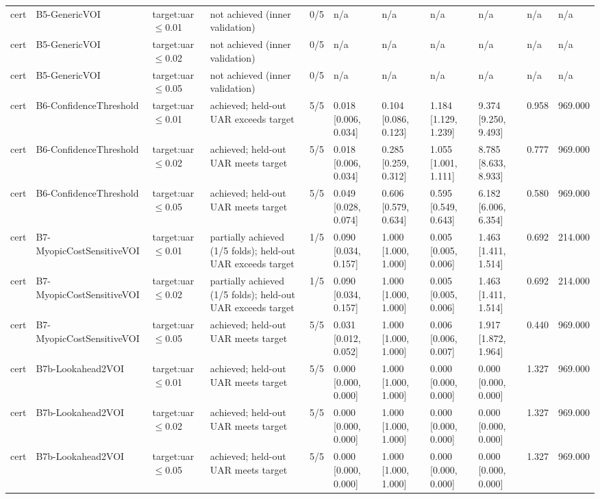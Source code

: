 \begin{table}[!ht]
{\begin{tabular}{lllllllllll}
cert & B5-GenericVOI & target:uar$\le$0.01 & not achieved (inner validation) & 0/5 & n/a & n/a & n/a & n/a & n/a & n/a \\
cert & B5-GenericVOI & target:uar$\le$0.02 & not achieved (inner validation) & 0/5 & n/a & n/a & n/a & n/a & n/a & n/a \\
cert & B5-GenericVOI & target:uar$\le$0.05 & not achieved (inner validation) & 0/5 & n/a & n/a & n/a & n/a & n/a & n/a \\
cert & B6-ConfidenceThreshold & target:uar$\le$0.01 & achieved; held-out UAR exceeds target & 5/5 & 0.018 [0.006, 0.034] & 0.104 [0.086, 0.123] & 1.184 [1.129, 1.239] & 9.374 [9.250, 9.493] & 0.958 & 969.000 \\
cert & B6-ConfidenceThreshold & target:uar$\le$0.02 & achieved; held-out UAR meets target & 5/5 & 0.018 [0.006, 0.034] & 0.285 [0.259, 0.312] & 1.055 [1.001, 1.111] & 8.785 [8.633, 8.933] & 0.777 & 969.000 \\
cert & B6-ConfidenceThreshold & target:uar$\le$0.05 & achieved; held-out UAR meets target & 5/5 & 0.049 [0.028, 0.074] & 0.606 [0.579, 0.634] & 0.595 [0.549, 0.643] & 6.182 [6.006, 6.354] & 0.580 & 969.000 \\
cert & B7-MyopicCostSensitiveVOI & target:uar$\le$0.01 & partially achieved (1/5 folds); held-out UAR exceeds target & 1/5 & 0.090 [0.034, 0.157] & 1.000 [1.000, 1.000] & 0.005 [0.005, 0.006] & 1.463 [1.411, 1.514] & 0.692 & 214.000 \\
cert & B7-MyopicCostSensitiveVOI & target:uar$\le$0.02 & partially achieved (1/5 folds); held-out UAR exceeds target & 1/5 & 0.090 [0.034, 0.157] & 1.000 [1.000, 1.000] & 0.005 [0.005, 0.006] & 1.463 [1.411, 1.514] & 0.692 & 214.000 \\
cert & B7-MyopicCostSensitiveVOI & target:uar$\le$0.05 & achieved; held-out UAR meets target & 5/5 & 0.031 [0.012, 0.052] & 1.000 [1.000, 1.000] & 0.006 [0.006, 0.007] & 1.917 [1.872, 1.964] & 0.440 & 969.000 \\
cert & B7b-Lookahead2VOI & target:uar$\le$0.01 & achieved; held-out UAR meets target & 5/5 & 0.000 [0.000, 0.000] & 1.000 [1.000, 1.000] & 0.000 [0.000, 0.000] & 0.000 [0.000, 0.000] & 1.327 & 969.000 \\
cert & B7b-Lookahead2VOI & target:uar$\le$0.02 & achieved; held-out UAR meets target & 5/5 & 0.000 [0.000, 0.000] & 1.000 [1.000, 1.000] & 0.000 [0.000, 0.000] & 0.000 [0.000, 0.000] & 1.327 & 969.000 \\
cert & B7b-Lookahead2VOI & target:uar$\le$0.05 & achieved; held-out UAR meets target & 5/5 & 0.000 [0.000, 0.000] & 1.000 [1.000, 1.000] & 0.000 [0.000, 0.000] & 0.000 [0.000, 0.000] & 1.327 & 969.000 \\

\end{tabular}}
\end{table}
